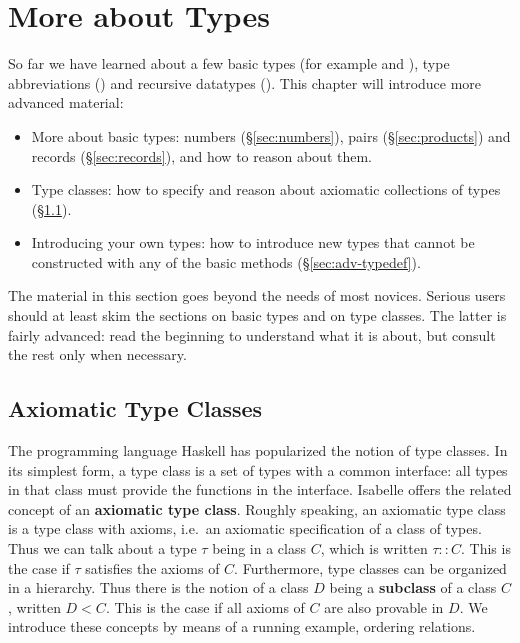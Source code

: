 \chapter{More about Types}
\label{ch:more-types}

So far we have learned about a few basic types (for example  and
), type abbreviations () and recursive datatypes
(). This chapter will introduce more
advanced material:
\begin{itemize}
\item More about basic types: numbers ({\S}\ref{sec:numbers}), pairs
  ({\S}\ref{sec:products}) and records ({\S}\ref{sec:records}), and how to
  reason about them.
\item Type classes: how to specify and reason about axiomatic collections of
  types ({\S}\ref{sec:axclass}).
\item Introducing your own types: how to introduce new types that
  cannot be constructed with any of the basic methods
  ({\S}\ref{sec:adv-typedef}).
\end{itemize}

The material in this section goes beyond the needs of most novices.  Serious
users should at least skim the sections on basic types and on type classes.
The latter is fairly advanced: read the beginning to understand what it is
about, but consult the rest only when necessary.








\section{Axiomatic Type Classes}
\label{sec:axclass}


The programming language Haskell has popularized the notion of type classes.
In its simplest form, a type class is a set of types with a common interface:
all types in that class must provide the functions in the interface.
Isabelle offers the related concept of an \textbf{axiomatic type class}.
Roughly speaking, an axiomatic type class is a type class with axioms, i.e.\ 
an axiomatic specification of a class of types. Thus we can talk about a type
$\tau$ being in a class $C$, which is written $\tau :: C$.  This is the case if
$\tau$ satisfies the axioms of $C$. Furthermore, type classes can be
organized in a hierarchy. Thus there is the notion of a class $D$ being a
\textbf{subclass} of a class $C$, written $D < C$. This is the case if all
axioms of $C$ are also provable in $D$. We introduce these concepts
by means of a running example, ordering relations.

